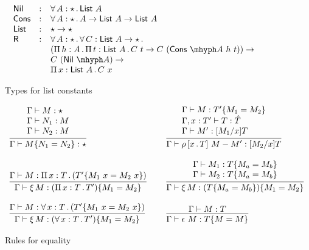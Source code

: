 \documentclass{article}
\begin{document}
\begin{figure}
  \[
  \begin{array}{lll}
  \mathsf{Nil} & : & \allt{A}{\star}{\mathsf{List}\ A}
\\
\mathsf{Cons} & : & \allt{A}{\star}{A \to \mathsf{List}\ A \to \mathsf{List}\ A}
 \\
 \mathsf{List} & : & \star \to \star
 \\
 \mathsf{R} & : & \allt{A}{\star}{\allt{C}{\mathsf{List}\ A \to \star}{\ }} \\
   \ &\ &
   (\Pia{h}{A}{\Pia{t}{\mathsf{List}\ A}{C\ t \to C\ (\appe{\mathsf{Cons}}{A}\ h\ t)}}) \to \\
   \ &\ &  C\ (\appe{\mathsf{Nil}}{A}) \to \\
   \ &\ & \Pia{x}{\mathsf{List}\ A}{C\ x}
  \end{array}
  \]
\caption{Types for list constants}
\label{fig:sartplist}
  \end{figure}

\begin{figure}
  \[
  \begin{array}{lll}
  \infer{\Gamma \vdash \eqtm{N_1}{M}{N_2} : \star}{\begin{array}{l}\Gamma \vdash M : \star \\ \Gamma \vdash N_1 : M \\ \Gamma \vdash N_2 : M\end{array}}
  &\ &
  \infer{\Gamma \vdash \cng{x}{T}{M}{M'} : [M_2/x]T}
        {\begin{array}{l}\Gamma \vdash M : \eqtm{M_1}{T'}{M_2} \\ \Gamma , x : T' \vdash T : \hat{T} \\ \Gamma \vdash M' : [M_1/x]T
        \end{array}}
  \\ \\
     \infer{\Gamma \vdash \ext{M} : \eqtm{M_1}{(\Pia{x}{T}{T'})}{M_2}}{\Gamma \vdash M : \Pia{x}{T}{(\eqtm{M_1\ x}{T'}{M_2\ x})}}
    &\ &
          \infer{\Gamma \vdash \ext{M} : \eqtm{M_1}{(\eqtm{M_a}{T}{M_b})}{M_2}}
                {\begin{array}{l}\Gamma \vdash M_1 :\eqtm{M_a}{T}{M_b} \\ \Gamma \vdash M_2 : \eqtm{M_a}{T}{M_b} \end{array}}
\\ \\ 
     \infer{\Gamma \vdash \ext{M} : \eqtm{M_1}{(\allt{x}{T}{T'})}{M_2}}{\Gamma \vdash M : \allt{x}{T}{(\eqtm{M_1\ x}{T'}{M_2\ x})}}
    &\ & 
    \infer{\Gamma \vdash \rfl{M} : \eqtm{M}{T}{M}}{\Gamma \vdash M : T}

\end{array}
  \]
  \caption{Rules for equality}
  \label{fig:sartpeq}
  \end{figure}
\end{document}
